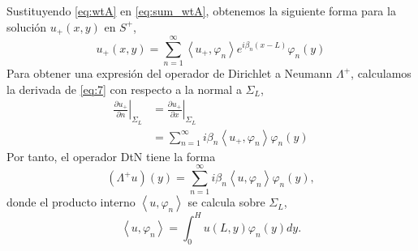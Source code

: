 \documentclass[11pt]{article}
\begin{document}
Sustituyendo \eqref{eq:wtA} en \eqref{eq:sum_wtA}, obtenemos la siguiente forma para la solución $u_+(x,y)$ en $S^+$,
\begin{equation}
  \label{eq:7}
  u_+(x,y) = \sum_{n=1}^\infty \left\langle u_+, \varphi_n\right\rangle e^{i \beta_n (x-L)}\varphi_n(y)  
\end{equation}
Para obtener una expresión del operador de Dirichlet a Neumann $\Lambda^+$, calculamos la derivada de \eqref{eq:7} con respecto a la normal a $\Sigma_L$,
\begin{align}
  \label{eq:8}
  \left.\frac{\partial u_+}{\partial n}\right|_{\Sigma_L} &= \left.\frac{\partial u_+}{\partial x}\right|_{\Sigma_L} \\
                                  &= \sum_{n=1}^\infty i \beta_n \left\langle u_+, \varphi_n\right\rangle \varphi_n(y)
\end{align}
Por tanto, el operador DtN tiene la forma
\begin{equation}
  \label{eq:16}
  (\Lambda^+ u)(y) = \sum_{n=1}^\infty i \beta_n \left\langle u, \varphi_n\right\rangle \varphi_n(y),
\end{equation}
donde el producto interno $\left\langle u, \varphi_n\right\rangle$ se calcula sobre $\Sigma_L$,
\begin{equation}
  \label{eq:17}
  \left\langle u, \varphi_n\right\rangle = \int_0^H u(L,y)\varphi_n(y) dy.
\end{equation}
\end{document}
